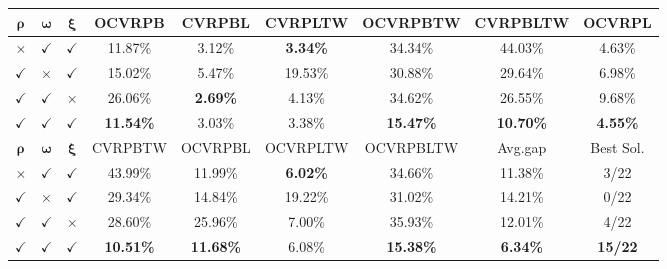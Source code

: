 \documentclass{article}
\theoremstyle{plain}
\theoremstyle{definition}
\theoremstyle{remark}
\begin{document}
\begin{table}[htbp]
{\begin{tabular}{ccc|c|c|c|c|c|c}
    \midrule
     $\bm{\rho}$ & $\bm{\omega}$ & $\bm{\xi}$     & OCVRPB & CVRPBL & CVRPLTW & OCVRPBTW & CVRPBLTW & OCVRPL \\
    \midrule
    $\times$ & $\checkmark$     & $\checkmark$     & 11.87\% & 3.12\% & \cellcolor[HTML]{D0CECE}\textbf{3.34\%} & 34.34\% & 44.03\% & 4.63\% \\
    $\checkmark$     & $\times$ & $\checkmark$     & 15.02\% & 5.47\% & 19.53\% & 30.88\% & 29.64\% & 6.98\% \\
    $\checkmark$     & $\checkmark$     & $\times$ & 26.06\% & \cellcolor[HTML]{D0CECE}\textbf{2.69\%} & 4.13\% & 34.62\% & 26.55\% & 9.68\% \\
    $\checkmark$     & $\checkmark$     & $\checkmark$     & \cellcolor[HTML]{D0CECE}\textbf{11.54\%} & 3.03\% & 3.38\% & \cellcolor[HTML]{D0CECE}\textbf{15.47\%} & \cellcolor[HTML]{D0CECE}\textbf{10.70\%} & \cellcolor[HTML]{D0CECE}\textbf{4.55\%} \\
    \midrule
    \midrule
     $\bm{\rho}$ & $\bm{\omega}$ & $\bm{\xi}$     & CVRPBTW & OCVRPBL & OCVRPLTW & OCVRPBLTW & Avg.gap & Best Sol. \\
    \midrule
    $\times$ & $\checkmark$     & $\checkmark$     & 43.99\% & 11.99\% & \cellcolor[HTML]{D0CECE}\textbf{6.02\%} & 34.66\% & 11.38\% & 3/22 \\
    $\checkmark$     & $\times$ & $\checkmark$     & 29.34\% & 14.84\% & 19.22\% & 31.02\% & 14.21\% & 0/22 \\
    $\checkmark$     & $\checkmark$     & $\times$ & 28.60\% & 25.96\% & 7.00\% & 35.93\% & 12.01\% & 4/22 \\
    $\checkmark$     & $\checkmark$     & $\checkmark$     & \cellcolor[HTML]{D0CECE}\textbf{10.51\%} & \cellcolor[HTML]{D0CECE}\textbf{11.68\%} & 6.08\% & \cellcolor[HTML]{D0CECE}\textbf{15.38\%} & \cellcolor[HTML]{D0CECE}\textbf{6.34\%} & \cellcolor[HTML]{D0CECE}\textbf{15/22} \\
    \bottomrule[0.5mm]
    \end{tabular}%
    }
  \label{tab:effects_each_component_udr}%
\end{table}%
\end{document}
